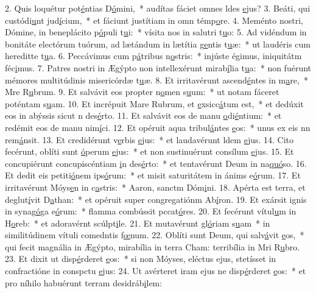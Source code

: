 2. Quis loquétur pot\uline{é}ntias D\uline{ó}mini,~* audítas fáciet omnes ldes \uline{e}jus?
3. Beáti, qui custódi\uline{u}nt jud\uline{í}cium,~* et fáciunt justítiam in omn témp\uline{o}re.
4. Meménto nostri, Dómine, in beneplácito p\uline{ó}puli t\uline{u}i:~* vísita nos in salutri t\uline{u}o:
5. Ad vidéndum in bonitáte electórum tuórum, ad lætándum in lætítia g\uline{e}ntis t\uline{u}æ:~* ut laudéris cum hereditte t\uline{u}a.
6. Peccávimus cum p\uline{á}tribus n\uline{o}stris:~* injúste égimus, iniquitátm féc\uline{i}mus.
7. Patres nostri in Ægýpto non intellexérunt mirab\uline{í}lia t\uline{u}a:~* non fuérunt mémores multitúdinis misericórdæ t\uline{u}æ.
8. Et irritavérunt ascend\uline{é}ntes in m\uline{a}re,~* Mre R\uline{u}brum.
9. Et salvávit eos propter n\uline{o}men s\uline{u}um:~* ut notam fáceret poténtam s\uline{u}am.
10. Et incrépuit Mare Rubrum, et \uline{e}xsicc\uline{á}tum est,~* et dedúxit eos in abýssis sicut n des\uline{é}rto.
11. Et salvávit eos de manu \uline{o}di\uline{é}ntium:~* et redémit eos de manu nim\uline{í}ci.
12. Et opéruit aqua tribul\uline{á}ntes \uline{e}os:~* unus ex eis nn rem\uline{á}nsit.
13. Et credidérunt v\uline{e}rbis \uline{e}jus:~* et laudavérunt ldem \uline{e}jus.
14. Cito fecérunt, oblíti sunt \uline{ó}perum \uline{e}jus:~* et non sustinuérunt consílum \uline{e}jus.
15. Et concupiérunt concupiscéntiam \uline{i}n des\uline{é}rto:~* et tentavérunt Deum in na\uline{quó}so.
16. Et dedit eis petiti\uline{ó}nem ips\uline{ó}rum:~* et misit saturitátem in ánims e\uline{ó}rum.
17. Et irritavérunt Móys\uline{e}n in c\uline{a}stris:~* Aaron, sanctm Dóm\uline{i}ni.
18. Apérta est terra, et deglut\uline{í}vit D\uline{a}than:~* et opéruit super congregatiónm Ab\uline{í}ron.
19. Et exársit ignis in synag\uline{ó}ga e\uline{ó}rum:~* flamma combússit pccat\uline{ó}res.
20. Et fecérunt vítul\uline{u}m in H\uline{o}reb:~* et adoravérnt scúlpt\uline{i}le.
21. Et mutavérunt gl\uline{ó}riam s\uline{u}am~* in similitúdinem vítuli comedntis f\uline{œ}num.
22. Oblíti sunt Deum, qui salv\uline{á}vit \uline{e}os,~* qui fecit magnália in Ægýpto, mirabília in terra Cham: terribília in Mri R\uline{u}bro.
23. Et dixit ut disp\uline{é}rderet \uline{e}os:~* si non Móyses, eléctus ejus, stetísset in confractióne in conspctu \uline{e}jus:
24. Ut avérteret iram ejus ne disp\uline{é}rderet \uline{e}os:~* et pro níhilo habuérunt terram desidráb\uline{i}lem:
